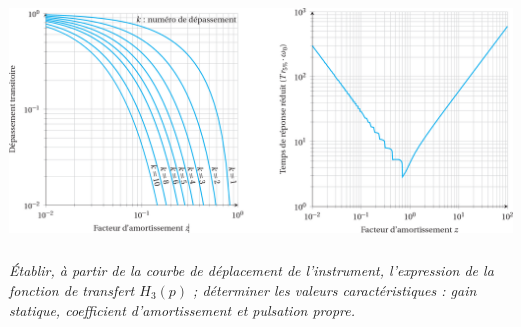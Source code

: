 \documentclass[10pt,fleqn]{article} %
\begin{document}
\begin{center}%
	\includegraphics[width=\linewidth]{images/img_03}

\end{center}


%
%
%



\subparagraph{}\textit{Établir, à partir de la courbe de déplacement de l'instrument, l'expression de la fonction de transfert $H_3(p)$ ; déterminer les valeurs caractéristiques : gain statique, coefficient d'amortissement et pulsation propre.}
\end{document}
